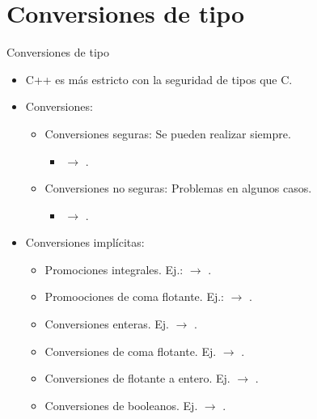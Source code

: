 \section{Conversiones de tipo}

\begin{frame}{Conversiones de tipo}
\begin{itemize}
  \item C++ es más estricto con la seguridad de tipos que C.
  \item Conversiones:
    \begin{itemize}
      \item \alert{Conversiones seguras}: Se pueden realizar siempre.
        \begin{itemize}
          \item {} $\rightarrow$ .
        \end{itemize}
      \item \alert{Conversiones no seguras}: Problemas en algunos casos.
        \begin{itemize}
          \item {} $\rightarrow$ .
        \end{itemize}
    \end{itemize}
  \item Conversiones implícitas:
    \begin{itemize}
      \item Promociones integrales. Ej.:  $\rightarrow$ .
      \item Promoociones de coma flotante. Ej.:  $\rightarrow$ .
      \item Conversiones enteras. Ej.  $\rightarrow$ .
      \item Conversiones de coma flotante. Ej.  $\rightarrow$ .
      \item Conversiones de flotante a entero. Ej.  $\rightarrow$ .
      \item Conversiones de booleanos. Ej.  $\rightarrow$ .
    \end{itemize}
\end{itemize}
\end{frame}

